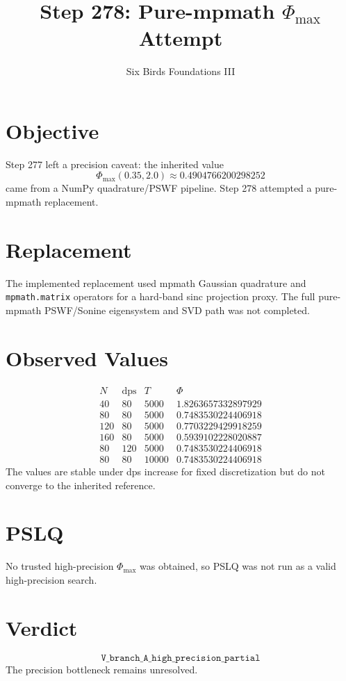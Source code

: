 \documentclass[11pt]{article}
\title{Step 278: Pure-mpmath \(\Phi_{\max}\) Attempt}
\author{Six Birds Foundations III}
\date{}
\begin{document}
\maketitle

\section*{Objective}
Step 277 left a precision caveat: the inherited value
\[
\Phi_{\max}(0.35,2.0)\approx 0.4904766200298252
\]
came from a NumPy quadrature/PSWF pipeline.  Step 278 attempted a pure-mpmath
replacement.

\section*{Replacement}
The implemented replacement used mpmath Gaussian quadrature and
\texttt{mpmath.matrix} operators for a hard-band sinc projection proxy.  The
full pure-mpmath PSWF/Sonine eigensystem and SVD path was not completed.

\section*{Observed Values}
\[
\begin{array}{c|c|c|c}
N & \mathrm{dps} & T & \Phi\\
\hline
40 & 80 & 5000 & 1.8263657332897929\\
80 & 80 & 5000 & 0.7483530224406918\\
120 & 80 & 5000 & 0.7703229429918259\\
160 & 80 & 5000 & 0.5939102228020887\\
80 & 120 & 5000 & 0.7483530224406918\\
80 & 80 & 10000 & 0.7483530224406918
\end{array}
\]
The values are stable under dps increase for fixed discretization but do not
converge to the inherited reference.

\section*{PSLQ}
No trusted high-precision \(\Phi_{\max}\) was obtained, so PSLQ was not run as a
valid high-precision search.

\section*{Verdict}
\[
\boxed{\texttt{V\_branch\_A\_high\_precision\_partial}}
\]
The precision bottleneck remains unresolved.
\end{document}
